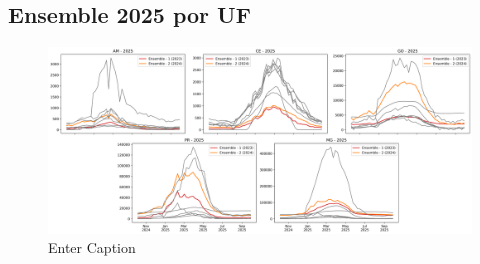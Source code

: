 

\subsection{Ensemble 2025 por UF}


\begin{figure}
    \centering
    \includegraphics[width=1\linewidth]{figures/ensemble_stack_final.png}
    \caption{Enter Caption}
    \label{fig:enter-label}
\end{figure}
